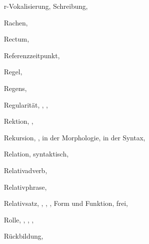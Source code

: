 \begin{theindex}
  \indexspace

  \item r-Vokalisierung, 
    \subitem Schreibung, 
  \item Rachen, 
  \item Rectum, 
  \item Referenzzeitpunkt, 
  \item Regel, 
  \item Regens, 
  \item Regularität, , , 
  \item Rektion, , 
  \item Rekursion, , 
    \subitem in der Morphologie, 
    \subitem in der Syntax, 
  \item Relation, 
    \subitem syntaktisch, 
  \item Relativadverb, 
  \item Relativphrase, 
  \item Relativsatz, , , 
		, 
    \subitem Form und Funktion, 
    \subitem frei, 
  \item Rolle, , , , 
  \item Rückbildung, 

  \indexspace


\end{theindex}
